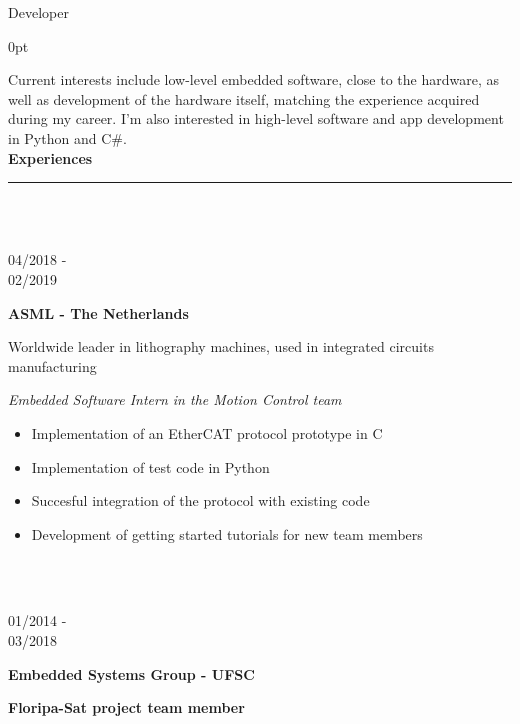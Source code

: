 \documentclass[a4paper]{article}
\begin{document}
	\LARGE Developer
	\vspace{12.5pt}
	\begin{adjustwidth}{\parindent}{0pt}
	\begin{minipage}[t]{0.65\textwidth}
	\large Current interests include low-level embedded software, close to the hardware, as well as development of the hardware itself, matching the experience acquired during my career. I'm also interested in high-level software and app development in Python and C\#. \\

	\Large{\textbf{Experiences}} \normalsize \\ \rule{\textwidth}{0.5pt} \\ \\
	\begin{minipage}[t]{0.2\textwidth}
	\large{04/2018 - \\ 02/2019}
	\end{minipage}
	\begin{minipage}[t]{0.8\textwidth}
	{
	  \setlength{\parskip}{5.5pt}
	  \Large{\textbf{ASML - The Netherlands}}
	  
	  \large{Worldwide leader in lithography machines, used in integrated circuits manufacturing}
	  
	  \large{\textit{Embedded Software Intern in the Motion Control team}}
	  \begin{itemize}
	    \item \normalsize{Implementation of an EtherCAT protocol prototype in C}
	    \item \normalsize{Implementation of test code in Python}
	    \item \normalsize{Succesful integration of the protocol with existing code}
	    \item \normalsize{Development of getting started tutorials for new team members}
	  \end{itemize}
	}
\end{minipage} \\ \\

\begin{minipage}[t]{0.2\textwidth}
  \large{01/2014 - \\ 03/2018}
\end{minipage}
\begin{minipage}[t]{0.8\textwidth}
{
  \setlength{\parskip}{5.5pt}
  \Large{\textbf{Embedded Systems Group - UFSC}}
  
  \large{\textbf{Floripa-Sat project team member}}
  
}
\end{minipage}
\end{minipage}
\end{adjustwidth}
\end{document}
